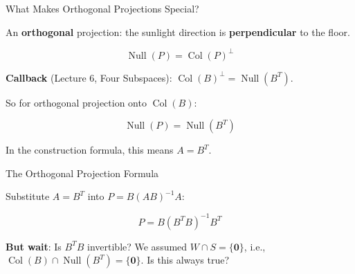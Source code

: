 \documentclass[10pt]{beamer}
\theoremstyle{definition}
\newcommand{\x}[1]{\alert{\textbf{#1}}}
\begin{document}
\begin{frame}{What Makes Orthogonal Projections Special?}

An \x{orthogonal} projection: the sunlight direction is \x{perpendicular} to the floor.

$$\operatorname{Null}(P) = \operatorname{Col}(P)^{\perp}$$

\vspace{0.5em}

\x{Callback} (Lecture 6, Four Subspaces): $\operatorname{Col}(B)^{\perp} = \operatorname{Null}(B^T)$.

\vspace{0.5em}

So for orthogonal projection onto $\operatorname{Col}(B)$:

$$\operatorname{Null}(P) = \operatorname{Null}(B^T)$$

\vspace{0.5em}

In the construction formula, this means $A = B^T$.

\end{frame}


\begin{frame}{The Orthogonal Projection Formula}

Substitute $A = B^T$ into $P = B(AB)^{-1}A$:

$$\boxed{P = B(B^TB)^{-1}B^T}$$

\vspace{0.5em}

\x{But wait}: Is $B^TB$ invertible? We assumed $W \cap S = \{\mathbf{0}\}$, i.e., $\operatorname{Col}(B) \cap \operatorname{Null}(B^T) = \{\mathbf{0}\}$. Is this always true?

\end{frame}
\end{document}
